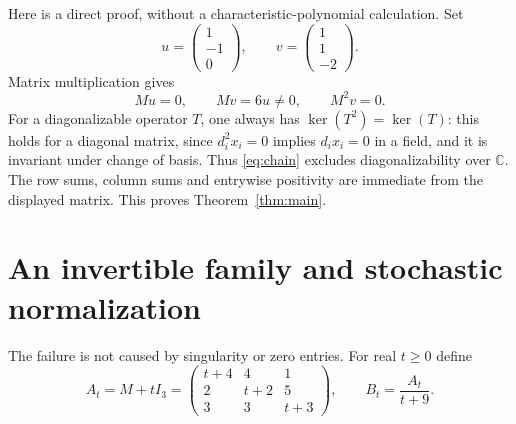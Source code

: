 \documentclass[11pt]{article}
\theoremstyle{remark}\newtheorem{remark}[theorem]{Remark}
\newcommand{\C}{\mathbb C}
\begin{document}
Here is a direct proof, without a characteristic-polynomial calculation.
Set
\[
 u=\begin{pmatrix}1\\-1\\0\end{pmatrix},\qquad
 v=\begin{pmatrix}1\\1\\-2\end{pmatrix}.
\]
Matrix multiplication gives
\begin{equation}\label{eq:chain}
 Mu=0,\qquad Mv=6u\ne0,\qquad M^2v=0.
\end{equation}
For a diagonalizable operator $T$, one always has
$\ker(T^2)=\ker(T)$: this holds for a diagonal matrix, since
$d_i^2x_i=0$ implies $d_ix_i=0$ in a field, and it is invariant under
change of basis. Thus \eqref{eq:chain} excludes diagonalizability over
$\C$. The row sums, column sums and entrywise positivity are immediate
from the displayed matrix. This proves Theorem~\ref{thm:main}.

\section{An invertible family and stochastic normalization}
The failure is not caused by singularity or zero entries.
For real $t\geq0$ define
\begin{equation}\label{eq:family}
 A_t=M+tI_3
 =\begin{pmatrix}t+4&4&1\\2&t+2&5\\3&3&t+3\end{pmatrix},
 \qquad B_t=\frac{A_t}{t+9}.
\end{equation}
\end{document}
